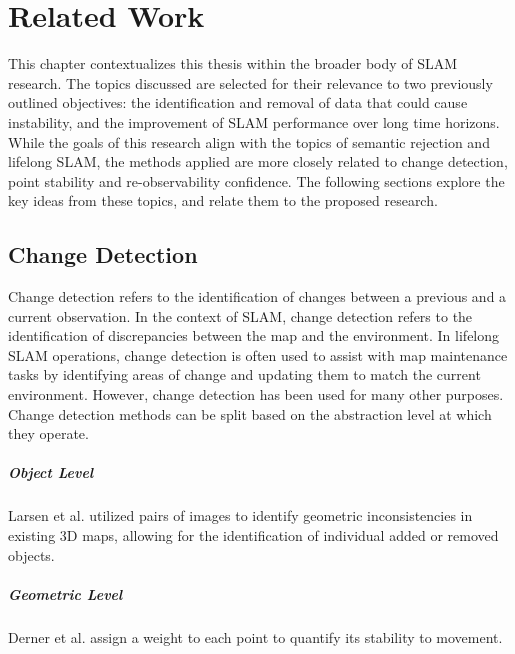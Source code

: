 \section{Related Work}
\label{sec:related_work}

This chapter contextualizes this thesis within the broader body of SLAM research. The topics discussed are selected for their relevance to two previously outlined objectives: the identification and removal of data that could cause instability, and the improvement of SLAM performance over long time horizons. While the goals of this research align with the topics of semantic rejection and lifelong SLAM, the methods applied are more closely related to change detection, point stability and re-observability confidence. The following sections explore the key ideas from these topics, and relate them to the proposed research.

\subsection{Change Detection}

Change detection refers to the identification of changes between a previous and a current observation.  In the context of SLAM, change detection refers to the identification of discrepancies between the map and the environment. In lifelong SLAM operations, change detection is often used to assist with map maintenance tasks by identifying areas of change and updating them to match the current environment. However, change detection has been used for many other purposes. Change detection methods can be split based on the abstraction level at which they operate.

\subparagraph{Object Level}
Larsen et al. \cite{larsenChangeDetectionModel} utilized pairs of images to identify geometric inconsistencies in existing 3D maps, allowing for the identification of individual added or removed objects.

\subparagraph{Geometric Level}
Derner et al. \cite{dernerChangeDetectionUsing2021} assign a weight to each point to quantify its stability to movement.




